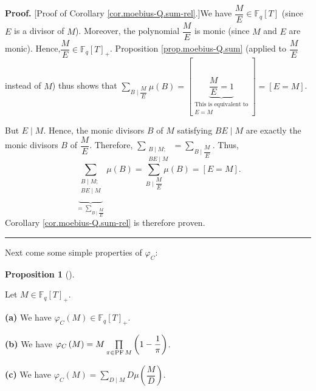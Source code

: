 \documentclass[numbers=enddot,12pt,final,onecolumn,notitlepage]{scrartcl}%
\theoremstyle{definition}
\newtheorem{prop}[theo]{Proposition}
\newenvironment{proposition}[1][]
{\begin{prop}[#1]\begin{leftbar}}
{\end{leftbar}\end{prop}}
\newenvironment{proof}[1][Proof]{\noindent\textbf{#1.} }{\ \rule{0.5em}{0.5em}}
\let\sumnonlimits\sum
\let\prodnonlimits\prod
\renewcommand{\sum}{\sumnonlimits\limits}
\renewcommand{\prod}{\prodnonlimits\limits}
\begin{document}
\begin{proof}
[Proof of Corollary \ref{cor.moebius-Q.sum-rel}.]We have $\dfrac{M}{E}%
\in\mathbb{F}_{q}\left[  T\right]  $ (since $E$ is a divisor of $M$).
Moreover, the polynomial $\dfrac{M}{E}$ is monic (since $M$ and $E$ are
monic). Hence,$\dfrac{M}{E}\in\mathbb{F}_{q}\left[  T\right]  _{+}$.
Proposition \ref{prop.moebius-Q.sum} (applied to $\dfrac{M}{E}$ instead of
$M$) thus shows that $\sum_{B\mid\dfrac{M}{E}}\mu\left(  B\right)  =\left[
\underbrace{\dfrac{M}{E}=1}_{\substack{\text{This is equivalent to}%
\\E=M}}\right]  =\left[  E=M\right]  $.

But $E\mid M$. Hence, the monic divisors $B$ of $M$ satisfying $BE\mid M$ are
exactly the monic divisors $B$ of $\dfrac{M}{E}$. Therefore, $\sum
_{\substack{B\mid M;\\BE\mid M}}=\sum_{B\mid\dfrac{M}{E}}$. Thus,%
\[
\underbrace{\sum_{\substack{B\mid M;\\BE\mid M}}}_{=\sum_{B\mid\dfrac{M}{E}}%
}\mu\left(  B\right)  =\sum_{B\mid\dfrac{M}{E}}\mu\left(  B\right)  =\left[
E=M\right]  .
\]
Corollary \ref{cor.moebius-Q.sum-rel} is therefore proven.
\end{proof}

Next come some simple properties of $\varphi_{C}$:

\begin{proposition}
\label{prop.phiC-Q.formula}Let $M\in\mathbb{F}_{q}\left[  T\right]  _{+}$.

\textbf{(a)} We have $\varphi_{C}\left(  M\right)  \in\mathbb{F}_{q}\left[
T\right]  _{+}$.

\textbf{(b)} We have $\varphi_{C}\left(  M\right)  =M\prod\limits_{\pi
\in\operatorname*{PF}M}\left(  1-\dfrac{1}{\pi}\right)  $.

\textbf{(c)} We have $\varphi_{C}\left(  M\right)  =\sum_{D\mid M}D\mu\left(
\dfrac{M}{D}\right)  $.
\end{proposition}
\end{document}
